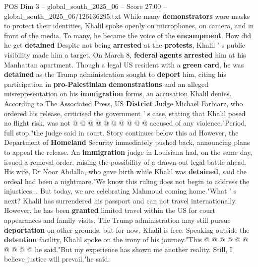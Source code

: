 \begin{textsample}{POS Dim 3 – global\_south\_2025\_06 – Score 27.00 – global\_south\_2025\_06/126136295.txt}
While many \textbf{demonstrators} wore masks to protect their identities, Khalil spoke openly on microphones, on camera, and in front of the media.
To many, he became the voice of the \textbf{encampment}.
How did he get \textbf{detained} Despite not being \textbf{arrested} at the \textbf{protests}, Khalil ' s public visibility made him a target.
On March 8, \textbf{federal} \textbf{agents} \textbf{arrested} him at his Manhattan apartment.
Though a legal US resident with a \textbf{green} \textbf{card}, he was \textbf{detained} as the Trump administration sought to \textbf{deport} him, citing his participation in \textbf{pro-Palestinian} \textbf{demonstrations} and an alleged misrepresentation on his \textbf{immigration} forms, an accusation Khalil denies.
According to The Associated Press, US \textbf{District} Judge Michael Farbiarz, who ordered his release, criticised the government ' s case, stating that Khalil posed no flight risk, was not @ @ @ @ @ @ @ @ @ @ accused of any violence."Period, full stop,"the judge said in court.
Story continues below this ad However, the Department of \textbf{Homeland} Security immediately pushed back, announcing plans to appeal the release.
An \textbf{immigration} judge in Louisiana had, on the same day, issued a removal order, raising the possibility of a drawn-out legal battle ahead.
His wife, Dr Noor Abdalla, who gave birth while Khalil was \textbf{detained}, said the ordeal had been a nightmare."We know this ruling does not begin to address the injustices...
But today, we are celebrating Mahmoud coming home."What ' s next?
Khalil has surrendered his passport and can not travel internationally.
However, he has been \textbf{granted} limited travel within the US for court appearances and family visits.
The Trump administration may still pursue \textbf{deportation} on other grounds, but for now, Khalil is free.
Speaking outside the \textbf{detention} facility, Khalil spoke on the irony of his journey."This @ @ @ @ @ @ @ @ @ @ he said."But my experience has shown me another reality.
Still, I believe justice will prevail,"he said.

\end{textsample}

